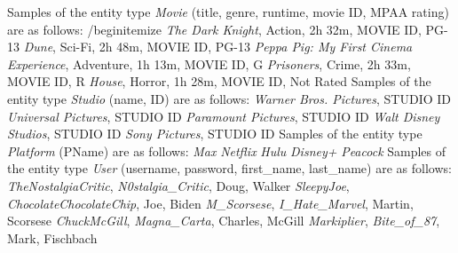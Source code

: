 \documentclass[12pt]{article}
\begin{document}
Samples of the entity type \emph{Movie} (title, genre, runtime, movie ID, MPAA rating) are as follows:
/begin{itemize}
\emph{The Dark Knight}, Action, 2h 32m, MOVIE ID, PG-13
\emph{Dune}, Sci-Fi, 2h 48m, MOVIE ID, PG-13
\emph{Peppa Pig: My First Cinema Experience}, Adventure, 1h 13m, MOVIE ID, G
\emph{Prisoners}, Crime, 2h 33m, MOVIE ID, R
\emph{House}, Horror, 1h 28m, MOVIE ID, Not Rated
Samples of the entity type \emph{Studio} (name, ID) are as follows:
\emph{Warner Bros. Pictures}, STUDIO ID
\emph{Universal Pictures}, STUDIO ID
\emph{Paramount Pictures}, STUDIO ID
\emph{Walt Disney Studios}, STUDIO ID
\emph{Sony Pictures}, STUDIO ID
Samples of the entity type \emph{Platform} (PName) are as follows:
\emph{Max}
\emph{Netflix}
\emph{Hulu}
\emph{Disney+}
\emph{Peacock}
Samples of the entity type \emph{User} (username, password, first_name, last_name) are as follows:
\emph{TheNostalgiaCritic}, \emph{N0stalgia_Critic}, Doug, Walker
\emph{SleepyJoe}, \emph{ChocolateChocolateChip}, Joe, Biden
\emph{M_Scorsese}, \emph{I_Hate_Marvel}, Martin, Scorsese
\emph{ChuckMcGill}, \emph{Magna_Carta}, Charles, McGill 
\emph{Markiplier}, \emph{Bite_of_87}, Mark, Fischbach


\end{document}

